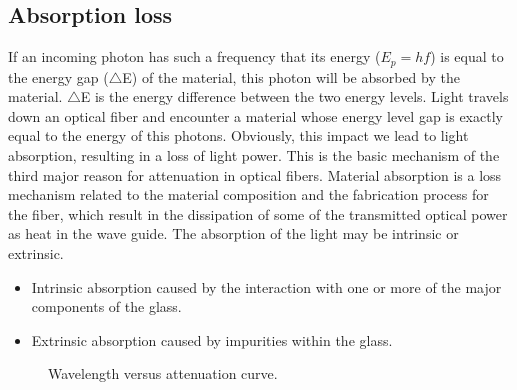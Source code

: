 \documentclass[12pt]{report}
\begin{document}
	\subsection{Absorption loss}
	If an incoming photon has such a frequency that its energy ($E_p=hf$) is equal to the energy gap ($\bigtriangleup$E) of the material, this photon will be absorbed by the material. $\bigtriangleup$E is the energy difference between the two energy levels. Light travels down an optical fiber and encounter a material whose energy level gap is exactly equal to the energy of this photons. Obviously, this impact we lead to light absorption, resulting in a loss of light power. This is the basic mechanism of the third major reason for attenuation in optical fibers. Material absorption is a loss mechanism related to the material composition and the fabrication process for the fiber, which result in the dissipation of some of the transmitted optical power as heat in the wave guide. The absorption of the light may be intrinsic or extrinsic.
	\begin{itemize}
			\item Intrinsic absorption caused by the interaction with one or more of the major components of the glass.
			\item Extrinsic absorption caused by impurities within the glass.
	\end{itemize}
	\begin{figure}[htbp]
		\caption{Wavelength versus attenuation curve.}
		\label{fig:attenuation_curve}
	\end{figure}
\end{document}

